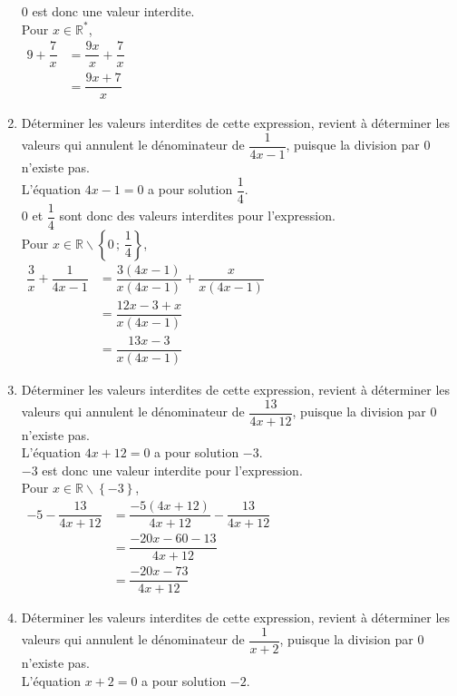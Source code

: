 \documentclass[a4paper, french, 12pt]{article}  %
\newcounter{correc}
\newenvironment{corrige}[1]
{\par \bigskip  \noindent \addtocounter{correc}{1} \hrulefill \quad { \large \textbf{Corrigé de l'exercice \thecorrec}} \quad \hrulefill \par \medskip }
{\par \bigskip }
\begin{document}
\begin{corrige}{}
\begin{enumerate}[itemsep=1em]
            $0$ est donc une valeur interdite. \\
            Pour $x\in \mathbb{R}^*$, \\
            $\begin{aligned}
            9+\dfrac{7}{x}&=\dfrac{9x}{x}+\dfrac{7}{x}\\
            &=\dfrac{9x+7}{x}
            \end{aligned}$
\item Déterminer les valeurs interdites de cette expression, revient à déterminer les valeurs qui annulent le dénominateur de $\dfrac{1}{4x-1}$,
            puisque la division par $0$ n'existe pas.\\ L'équation $4x-1=0$ a pour solution $\dfrac{1}{4}$. \\
             $0$ et $\dfrac{1}{4}$ sont donc des valeurs interdites pour l'expression. \\
            Pour $x\in \mathbb{R}\smallsetminus\left\{0\,;\,\dfrac{1}{4}\right\}$,\\
            $\begin{aligned}
            \dfrac{3}{x}+\dfrac{1}{4x-1}&=\dfrac{3(4x-1)}{x(4x-1)}+\dfrac{x}{x(4x-1)}\\
           & =\dfrac{12x-3+x}{x(4x-1)}\\
           &=\dfrac{13x-3}{x(4x-1)}
           \end{aligned}$
\item Déterminer les valeurs interdites de cette expression, revient à  déterminer les valeurs qui annulent le dénominateur de $\dfrac{13}{4x+12}$,
            puisque la division par $0$ n'existe pas.\\L'équation $4x+12=0$ a pour solution $-3$. \\
            $-3$ est donc une valeur interdite pour l'expression. \\
            Pour $x\in \mathbb{R}\smallsetminus\left\{-3\right\}$, \\
            $\begin{aligned}
-5-\dfrac{13}{4x+12}&=\dfrac{-5(4x+12)}{4x+12}-\dfrac{13}{4x+12}\\
            &=\dfrac{-20x-60-13}{4x+12}\\
            &=\dfrac{-20x-73}{4x+12}
            \end{aligned}$
\item Déterminer les valeurs interdites de cette expression, revient à
            déterminer les valeurs qui annulent le dénominateur de $\dfrac{1}{x+2}$,
            puisque la division par $0$ n'existe pas.\\L'équation $x+2=0$ a pour solution $-2$. \\

\end{enumerate}
\end{corrige}
\end{document}

